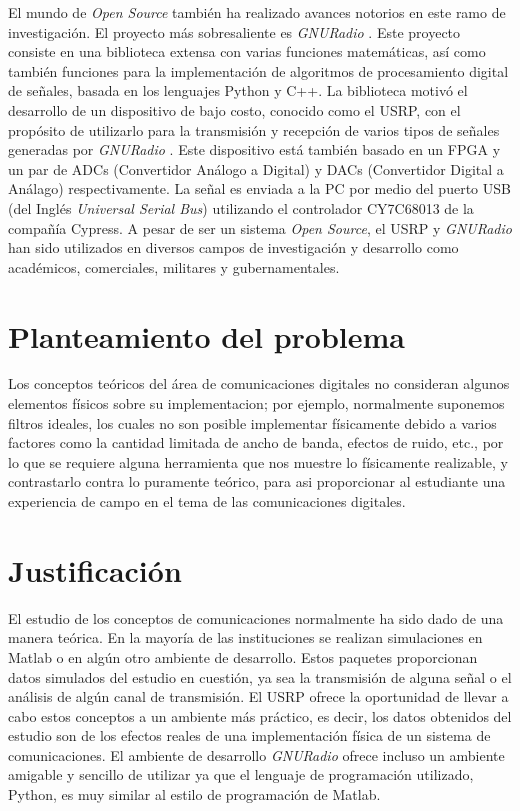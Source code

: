 El mundo de \emph{Open Source} tambi\'en ha realizado avances notorios en este ramo de investigaci\'on. El proyecto m\'as
sobresaliente es \emph{GNURadio} \cite{radio}. Este proyecto consiste en una biblioteca extensa con varias funciones
matem\'aticas, as\'i como tambi\'en funciones para la implementaci\'on de algoritmos de procesamiento digital de se\~nales,
basada en los lenguajes Python y C++. La biblioteca motiv\'o el desarrollo de un dispositivo de bajo costo, conocido
como el USRP, con el prop\'osito de utilizarlo para la transmisi\'on y recepci\'on de varios tipos de se\~nales generadas
por \emph{GNURadio} \cite{ettus}. Este dispositivo est\'a tambi\'en basado en un FPGA y un par de ADCs (Convertidor
An\'alogo a Digital) y DACs (Convertidor Digital a An\'alago) respectivamente. La se\~nal es enviada a la PC por medio del puerto USB
(del Ingl\'es \emph{Universal Serial Bus}) utilizando el controlador CY7C68013 de la compa\~n\'ia Cypress. A pesar de ser un
sistema \emph{Open Source}, el USRP y \emph{GNURadio} han sido utilizados en diversos campos de investigaci\'on y desarrollo como
acad\'emicos, comerciales, militares y gubernamentales.

\section{Planteamiento del problema}
Los conceptos te\'oricos del \'area de comunicaciones digitales no consideran algunos elementos f\'isicos sobre su
implementacion; por ejemplo, normalmente suponemos filtros ideales, los cuales no son posible implementar f\'isicamente
debido a varios factores como la cantidad limitada de ancho de banda, efectos de ruido, etc., por lo que se requiere alguna
herramienta que nos muestre lo f\'isicamente realizable, y contrastarlo contra lo puramente te\'orico, para asi proporcionar
al estudiante una experiencia de campo en el tema de las comunicaciones digitales.

\section{Justificaci\'on}

El estudio de los conceptos de comunicaciones normalmente ha sido dado de una manera te\'orica. En la mayor\'ia de las
instituciones se realizan simulaciones en Matlab o en alg\'un otro ambiente de desarrollo. Estos paquetes proporcionan datos
simulados del estudio en cuesti\'on, ya sea la transmisi\'on de alguna se\~nal o el an\'alisis de alg\'un canal de transmisi\'on.
El USRP ofrece la oportunidad de llevar a cabo estos conceptos a un ambiente m\'as pr\'actico, es decir, los datos obtenidos del
estudio son de los efectos reales de una implementaci\'on f\'isica de un sistema de comunicaciones. El ambiente de desarrollo
\emph{GNURadio} ofrece incluso un ambiente amigable y sencillo de utilizar ya que el lenguaje de programaci\'on utilizado,
Python, es muy similar al estilo de programaci\'on de Matlab.

